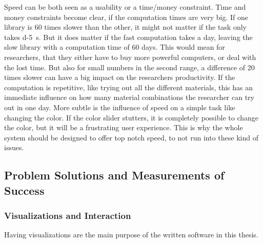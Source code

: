 \begin{itemize}
    Speed can be both seen as a usability or a time/money constraint. 
    Time and money constraints become clear, if the computation times are very big. If one library is 60 times slower than the other, it might not matter if the task only takes \SI{d-5}{\second}. But it does matter if the fast computation takes a day, leaving the slow library with a computation time of 60 days.
    This would mean for researchers, that they either have to buy more powerful computers, or deal with the lost time.
    But also for small numbers in the second range, a difference of 20 times slower can have a big impact on the researchers productivity. If the computation is repetitive, like trying out all the different materials, this has an immediate influence on how many material combinations the researcher can try out in one day.
    More subtle is the influence of speed on a simple task like changing the color. If the color slider stutters, it is completely possible to change the color, but it will be a frustrating user experience. 
    This is why the whole system should be designed to offer top notch speed, to not run into these kind of issues.

\end{itemize} 


\subsection{Problem Solutions and Measurements of Success}

\subsubsection{Visualizations and Interaction}

Having visualizations are the main purpose of the written software in this thesis.


